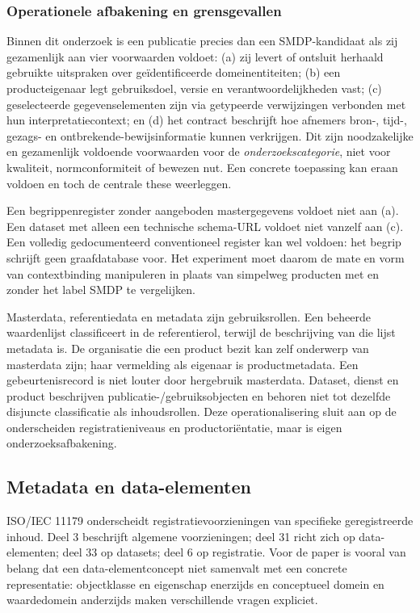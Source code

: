 \subsubsection{Operationele afbakening en grensgevallen}
Binnen dit onderzoek is een publicatie precies dan een SMDP-kandidaat als zij gezamenlijk aan vier voorwaarden voldoet: (a) zij levert of ontsluit herhaald gebruikte uitspraken over geïdentificeerde domeinentiteiten; (b) een producteigenaar legt gebruiksdoel, versie en verantwoordelijkheden vast; (c) geselecteerde gegevenselementen zijn via getypeerde verwijzingen verbonden met hun interpretatiecontext; en (d) het contract beschrijft hoe afnemers bron-, tijd-, gezags- en ontbrekende-bewijsinformatie kunnen verkrijgen. Dit zijn noodzakelijke en gezamenlijk voldoende voorwaarden voor de \emph{onderzoekscategorie}, niet voor kwaliteit, normconformiteit of bewezen nut. Een concrete toepassing kan eraan voldoen en toch de centrale these weerleggen.

Een begrippenregister zonder aangeboden mastergegevens voldoet niet aan (a). Een dataset met alleen een technische schema-URL voldoet niet vanzelf aan (c). Een volledig gedocumenteerd conventioneel register kan wel voldoen: het begrip schrijft geen graafdatabase voor. Het experiment moet daarom de mate en vorm van contextbinding manipuleren in plaats van simpelweg producten met en zonder het label SMDP te vergelijken.

Masterdata, referentiedata en metadata zijn gebruiksrollen. Een beheerde waardenlijst classificeert in de referentierol, terwijl de beschrijving van die lijst metadata is. De organisatie die een product bezit kan zelf onderwerp van masterdata zijn; haar vermelding als eigenaar is productmetadata. Een gebeurtenisrecord is niet louter door hergebruik masterdata. Dataset, dienst en product beschrijven publicatie-/gebruiksobjecten en behoren niet tot dezelfde disjuncte classificatie als inhoudsrollen. Deze operationalisering sluit aan op de onderscheiden registratieniveaus en productoriëntatie, maar is eigen onderzoeksafbakening. \citep{S08,S47,L12,L19}

\subsection{Metadata en data-elementen}
ISO/IEC 11179 onderscheidt registratievoorzieningen van specifieke geregistreerde inhoud. Deel 3 beschrijft algemene voorzieningen; deel 31 richt zich op data-elementen; deel 33 op datasets; deel 6 op registratie. \citep{S07,S08,S09,S10} Voor de paper is vooral van belang dat een data-elementconcept niet samenvalt met een concrete representatie: objectklasse en eigenschap enerzijds en conceptueel domein en waardedomein anderzijds maken verschillende vragen expliciet. \citep{S08}

